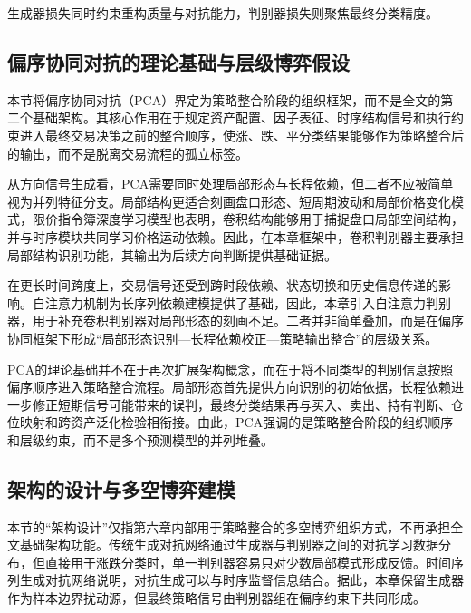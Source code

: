 生成器损失同时约束重构质量与对抗能力，判别器损失则聚焦最终分类精度。


\subsection{偏序协同对抗的理论基础与层级博弈假设}

本节将偏序协同对抗（PCA）界定为策略整合阶段的组织框架，而不是全文的第二个基础架构。其核心作用在于规定资产配置、因子表征、时序结构信号和执行约束进入最终交易决策之前的整合顺序，使涨、跌、平分类结果能够作为策略整合后的输出，而不是脱离交易流程的孤立标签。

从方向信号生成看，PCA需要同时处理局部形态与长程依赖，但二者不应被简单视为并列特征分支。局部结构更适合刻画盘口形态、短周期波动和局部价格变化模式，限价指令簿深度学习模型也表明，卷积结构能够用于捕捉盘口局部空间结构，并与时序模块共同学习价格运动依赖\cite{zhang2019DeepLOB}。因此，在本章框架中，卷积判别器主要承担局部结构识别功能，其输出为后续方向判断提供基础证据。

在更长时间跨度上，交易信号还受到跨时段依赖、状态切换和历史信息传递的影响。自注意力机制为长序列依赖建模提供了基础\cite{vaswani2017attention}，因此，本章引入自注意力判别器，用于补充卷积判别器对局部形态的刻画不足。二者并非简单叠加，而是在偏序协同框架下形成“局部形态识别—长程依赖校正—策略输出整合”的层级关系。

PCA的理论基础并不在于再次扩展架构概念，而在于将不同类型的判别信息按照偏序顺序进入策略整合流程。局部形态首先提供方向识别的初始依据，长程依赖进一步修正短期信号可能带来的误判，最终分类结果再与买入、卖出、持有判断、仓位映射和跨资产泛化检验相衔接。由此，PCA强调的是策略整合阶段的组织顺序和层级约束，而不是多个预测模型的并列堆叠。

\subsection{架构的设计与多空博弈建模}

本节的“架构设计”仅指第六章内部用于策略整合的多空博弈组织方式，不再承担全文基础架构功能。传统生成对抗网络通过生成器与判别器之间的对抗学习数据分布\cite{goodfellow2014generative}，但直接用于涨跌分类时，单一判别器容易只对少数局部模式形成反馈。时间序列生成对抗网络说明，对抗生成可以与时序监督信息结合\cite{yoon2019time}。据此，本章保留生成器作为样本边界扰动源，但最终策略信号由判别器组在偏序约束下共同形成。

